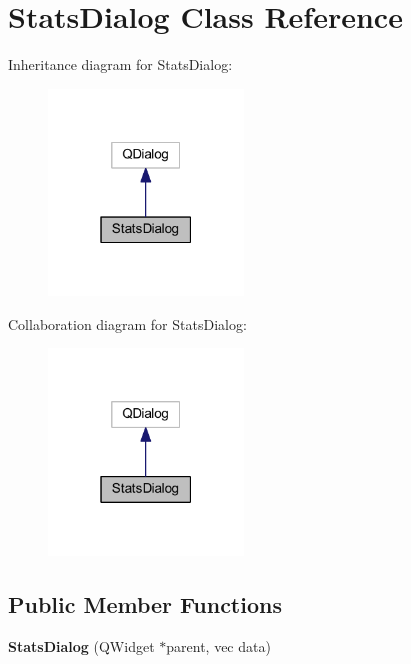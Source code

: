 \hypertarget{class_stats_dialog}{\section{Stats\+Dialog Class Reference}
\label{class_stats_dialog}
}


Inheritance diagram for Stats\+Dialog\+:\nopagebreak
\begin{figure}[H]
\begin{center}
\leavevmode
\includegraphics[width=147pt]{class_stats_dialog__inherit__graph}
\end{center}
\end{figure}


Collaboration diagram for Stats\+Dialog\+:\nopagebreak
\begin{figure}[H]
\begin{center}
\leavevmode
\includegraphics[width=147pt]{class_stats_dialog__coll__graph}
\end{center}
\end{figure}
\subsection*{Public Member Functions}
\begin{DoxyCompactItemize}
\item 
\hypertarget{class_stats_dialog_a756888f072acda0d7c60f229d3c569b7}{{\bfseries Stats\+Dialog} (Q\+Widget $\ast$parent, vec data)}\label{class_stats_dialog_a756888f072acda0d7c60f229d3c569b7}

\end{DoxyCompactItemize}


